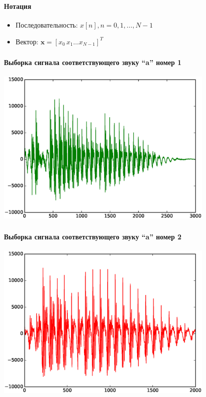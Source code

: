 \documentclass{beamer}
\begin{document}
\begin{frame} \label{cont}
  \frametitle{\insertsection}
    \framesubtitle{Нотация}
  \begin{itemize}
    \item Последовательность: $x[n], n = 0, 1, \ldots, N - 1 $  \pause
    \item Вектор: $ \mathbf{x} = [x_0\,x_1 \ldots x_{N - 1}]^T $
  \end{itemize}
\end{frame}

\begin{frame}
  \frametitle{\insertsection}
  \framesubtitle{Выборка сигнала соответствующего звуку ``a'' номер 1}
  \includegraphics[width=0.8\textwidth]{a1.eps}
\end{frame}

\begin{frame}
  \frametitle{\insertsection}
  \framesubtitle{Выборка сигнала соответствующего звуку ``a'' номер 2}
  \includegraphics[width=0.8\textwidth]{a2.eps}
\end{frame}
\end{document}
